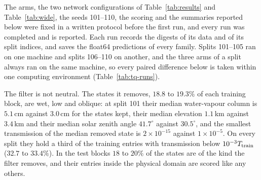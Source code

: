 The arms, the two network configurations of Table~\ref{tab:results} and Table~\ref{tab:wide}, the
seeds 101--110, the scoring and the summaries reported below were fixed in a written protocol
before the first run, and every run was completed and is reported. Each run records the digests of
its data and of its split indices, and saves the float64 predictions of every family. Splits
101--105 ran on one machine and splits 106--110 on another, and the three arms of a split always ran
on the same machine, so every paired difference below is taken within one computing environment
(Table~\ref{tab:tq-runs}).

\begin{table}[t]
\centering
\resizebox{\textwidth}{!}{}
\caption{Training on admissible targets: paired differences from the raw arm, arm minus raw, mean
$\pm$ sample standard deviation over ten splits. Radiance differences are in percentage
points of relative error, albedo differences in percentage points of the relative albedo error, and
the reflectance percentiles in percentage points; the physical $p_{95}$ uses the floor
$\tau_0=10^{-12}$. The columns headed lower count the splits on which the arm is below the raw
arm.}
\label{tab:tq-policy}
\end{table}

\begin{table}[t]
\centering
\resizebox{\textwidth}{!}{}
\caption{The convex stack against the kernel on features in each arm: the radiance difference, stack
minus feature kernel, in percentage points, and the ratio of their 95th-percentile reflectance errors
over all bands and on the physical domain at the three floors; mean $\pm$ sample standard deviation
over ten splits. The column headed lower counts the splits on which the stack has the lower
radiance error, and the columns headed $>1$ the splits on which it has the larger tail, over all bands
and at $\tau_0=10^{-12}$.}
\label{tab:tq-reversal}
\end{table}

The filter is not neutral. The states it removes, $18.8$ to $19.3\%$ of each training block, are wet,
low and oblique: at split 101 their median water-vapour column is $5.1$\,cm against $3.0$\,cm for the
states kept, their median elevation $1.1$\,km against $3.4$\,km and their median solar zenith angle
$41.7^\circ$ against $30.5^\circ$, and the smallest transmission of the median removed state is
$2\times10^{-15}$ against $1\times10^{-5}$. On every split they hold a third of the training entries
with transmission below $10^{-3}T_{\rm train}$ ($32.7$ to $33.4\%$). In the test blocks $18$ to $20\%$
of the states are of the kind the filter removes, and their entries inside the physical domain are
scored like any others.

